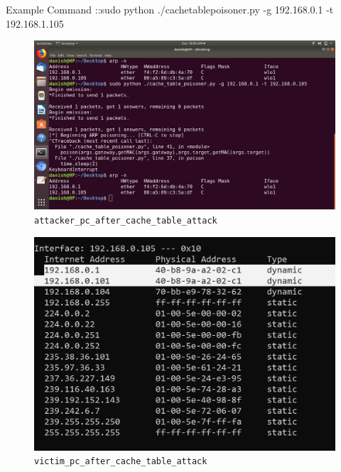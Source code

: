 \documentclass{article}
\begin{document}
Example Command ::sudo python ./cachetablepoisoner.py -g 192.168.0.1 -t 192.168.1.105
\begin{figure}[H]
\centering
\includegraphics[width=\textwidth]{images/attacker_pc_after_cache_table_attack.png}
\caption{\texttt{attacker\_pc\_after\_cache\_table\_attack}}
\end{figure}

\begin{figure}[H]
\centering
\includegraphics[width=\textwidth]{images/victim_pc_after_cache_table_attack.png}
\caption{\texttt{victim\_pc\_after\_cache\_table\_attack}}
\end{figure}
\end{document}
